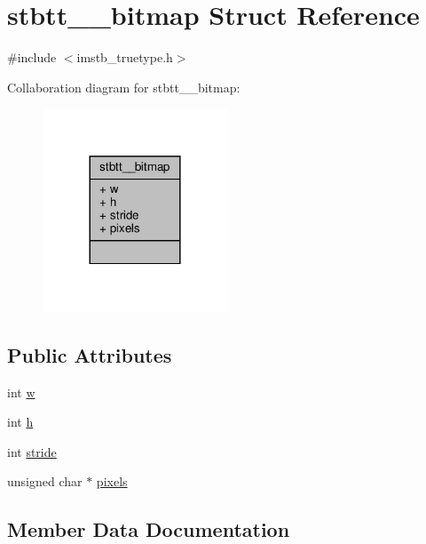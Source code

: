 \hypertarget{structstbtt____bitmap}{}\section{stbtt\+\_\+\+\_\+bitmap Struct Reference}
\label{structstbtt____bitmap}


{\ttfamily \#include $<$imstb\+\_\+truetype.\+h$>$}



Collaboration diagram for stbtt\+\_\+\+\_\+bitmap\+:
\nopagebreak
\begin{figure}[H]
\begin{center}
\leavevmode
\includegraphics[width=156pt]{structstbtt____bitmap__coll__graph}
\end{center}
\end{figure}
\subsection*{Public Attributes}
\begin{DoxyCompactItemize}
\item 
int \hyperlink{structstbtt____bitmap_afbd607426f0a457b1a871ed902eeb926}{w}
\item 
int \hyperlink{structstbtt____bitmap_a2afc802e26e9f1dda897ac16ecfff10e}{h}
\item 
int \hyperlink{structstbtt____bitmap_a48ee6b550ee4f1d85bfc32c62c0e9a98}{stride}
\item 
unsigned char $\ast$ \hyperlink{structstbtt____bitmap_ae6be77625faf55b110eaaffde5c7733c}{pixels}
\end{DoxyCompactItemize}


\subsection{Member Data Documentation}
\mbox{\label{structstbtt____bitmap_a2afc802e26e9f1dda897ac16ecfff10e}} 
